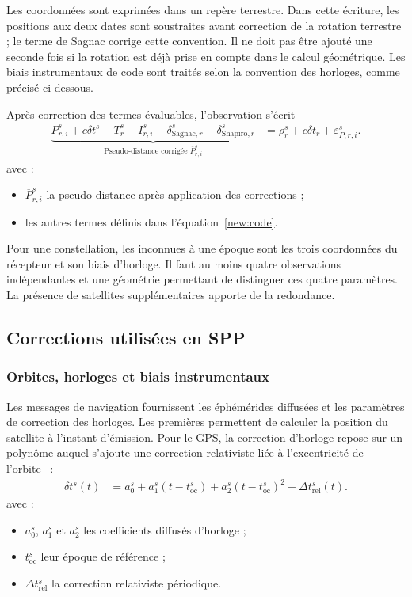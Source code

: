 Les coordonnées sont exprimées dans un repère terrestre. Dans cette écriture,
les positions aux deux dates sont soustraites avant correction de la rotation
terrestre ; le terme de Sagnac corrige cette convention. Il ne doit pas être
ajouté une seconde fois si la rotation est déjà prise en compte dans le calcul
géométrique. Les biais instrumentaux de code sont traités selon la convention
des horloges, comme précisé ci-dessous.

Après correction des termes évaluables, l'observation s'écrit
\begin{align}
\underbrace{P_{r,i}^s+c\delta t^s-T_r^s-I_{r,i}^s
-\delta_{\mathrm{Sagnac},r}^s-\delta_{\mathrm{Shapiro},r}^s}
_{\text{Pseudo-distance corrigée }\overline P_{r,i}^s}
&=\rho_r^s+c\delta t_r+\varepsilon_{P,r,i}^s.
\label{new:corrected_code}
\end{align}
avec :
\begin{itemize}
\item $\overline P_{r,i}^s$ la pseudo-distance après application des corrections ;
\item les autres termes définis dans l'équation~\eqref{new:code}.
\end{itemize}

Pour une constellation, les inconnues à une époque sont les trois coordonnées
du récepteur et son biais d'horloge. Il faut au moins quatre observations
indépendantes et une géométrie permettant de distinguer ces quatre paramètres.
La présence de satellites supplémentaires apporte de la redondance.

\subsection{Corrections utilisées en SPP}
\label{new:corrections}

\subsubsection{Orbites, horloges et biais instrumentaux}

Les messages de navigation fournissent les éphémérides diffusées et les
paramètres de correction des horloges. Les premières permettent de calculer
la position du satellite à l'instant d'émission. Pour le GPS, la correction
d'horloge repose sur un polynôme auquel s'ajoute une correction relativiste
liée à l'excentricité de l'orbite~\cite{isgps200n,ashby2003} :
\begin{align}
\delta t^s(t)&=a_0^s+a_1^s(t-t_{\mathrm{oc}}^s)
+a_2^s(t-t_{\mathrm{oc}}^s)^2+\Delta t_{\mathrm{rel}}^s(t).
\label{new:clock}
\end{align}
avec :
\begin{itemize}
\item $a_0^s$, $a_1^s$ et $a_2^s$ les coefficients diffusés d'horloge ;
\item $t_{\mathrm{oc}}^s$ leur époque de référence ;
\item $\Delta t_{\mathrm{rel}}^s$ la correction relativiste périodique.
\end{itemize}

